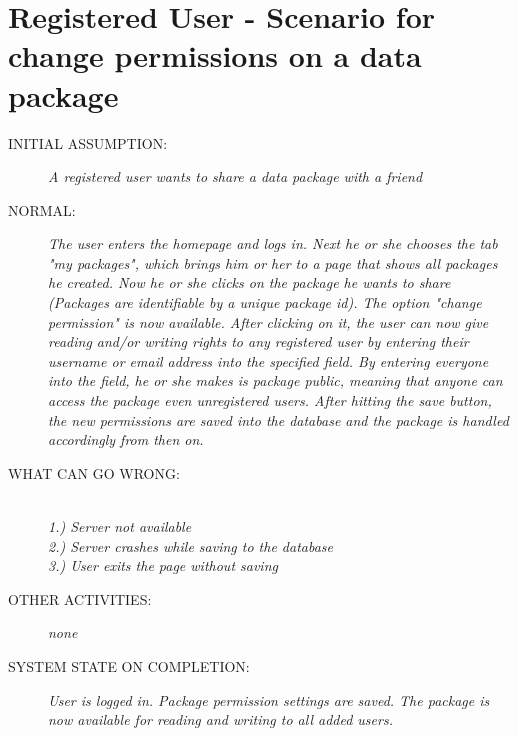 \section{Registered User - Scenario for change permissions on a data package}
\begin{description}
  \item [INITIAL ASSUMPTION:]
    \textit{A registered user wants to share a data package with a friend}
  \item [NORMAL:]
    \textit{The user enters the homepage and logs in. Next he or she chooses the tab "my packages", which brings him or her to a page that shows all packages he created. Now he or she clicks on the package he wants to share (Packages are identifiable by a unique package id). The option "change permission" is now available. After clicking on it, the user can now give reading and/or writing rights to any registered user by entering their username or email address into the specified field. By entering everyone into the field, he or she makes is package public, meaning that anyone can access the package even unregistered users. After hitting the save button, the new permissions are saved into the database and the package is handled accordingly from then on.}
  \item [WHAT CAN GO WRONG:]
    \textit{\\1.) Server not available \\2.) Server crashes while saving to the database \\3.) User exits the page without saving
}
  \item [OTHER ACTIVITIES:]
    \textit{none}
  \item [SYSTEM STATE ON COMPLETION:]
    \textit{User is logged in. Package permission settings are saved. The package is now available for reading and writing to all added users.}
\end{description}

